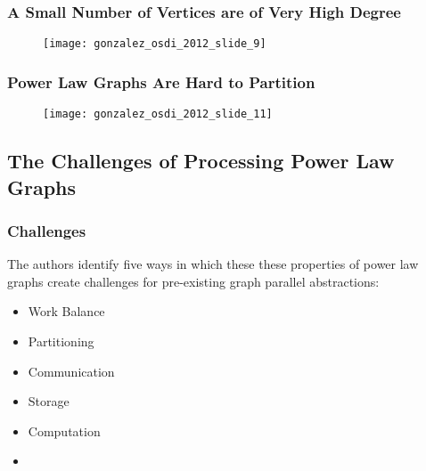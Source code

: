 \begin{frame}
  \frametitle{A Small Number of Vertices are of Very High Degree}
  \begin{figure}
    \centering
    \texttt{[image: gonzalez\_osdi\_2012\_slide\_9]}
    \caption{\cite[OSDI '12 Slides]{gonzalez2012powergraph-slides}}
  \end{figure}
\end{frame}

\begin{frame}
  \frametitle{Power Law Graphs Are Hard to Partition}
  \begin{figure}
    \centering
    \texttt{[image: gonzalez\_osdi\_2012\_slide\_11]}
    \caption{\cite[OSDI '12 Slides]{gonzalez2012powergraph-slides}}
  \end{figure}
\end{frame}


\subsection{The Challenges of Processing Power Law Graphs}

\begin{frame}
  \frametitle{Challenges}
  The authors identify five ways in which these these properties of power law
  graphs create challenges for pre-existing graph parallel abstractions:
  \begin{itemize}
    \item Work Balance
    \item Partitioning
    \item Communication
    \item Storage
    \item Computation
  \end{itemize}
\end{frame}


\begin{frame}
\begin{itemize}
  \item %
\end{itemize}
\end{frame}
